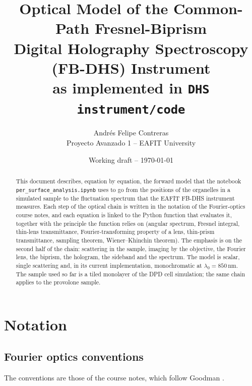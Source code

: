 \documentclass[11pt,a4paper]{article}
\title{Optical Model of the Common-Path Fresnel-Biprism\\
Digital Holography Spectroscopy (FB-DHS) Instrument\\[4pt]
\large as implemented in \texttt{DHS instrument/code}}
\author{Andr\'es Felipe Contreras\\ \small Proyecto Avanzado 1 -- EAFIT University}
\date{Working draft -- \today}
\newcommand{\nm}{\,\mathrm{nm}}
\newcommand{\code}[1]{\texttt{\small #1}}
\begin{document}
\maketitle

\begin{abstract}
This document describes, equation by equation, the forward model that the
notebook \code{per\_surface\_analysis.ipynb} uses to go from the positions of
the organelles in a simulated sample to the fluctuation spectrum that the
EAFIT FB-DHS instrument \cite{lopez2026} measures. Each step of the optical
chain is written in the notation of the Fourier-optics course notes, and each
equation is linked to the Python function that evaluates it, together with the
principle the function relies on (angular spectrum, Fresnel integral, thin-lens
transmittance, Fourier-transforming property of a lens, thin-prism
transmittance, sampling theorem, Wiener--Khinchin theorem). The emphasis is on
the second half of the chain: scattering in the sample, imaging by the
objective, the Fourier lens, the biprism, the hologram, the sideband and the
spectrum. The model is scalar, single scattering and, in its current
implementation, monochromatic at $\lambda_0 = 850\nm$. The sample used so far
is a tiled monolayer of the DPD cell simulation; the same chain applies to the
provolone sample.
\end{abstract}

\tableofcontents

\section{Notation}
\label{sec:notation}

\subsection{Fourier optics conventions}

The conventions are those of the course notes, which follow Goodman
\cite{goodman}.
\end{document}
